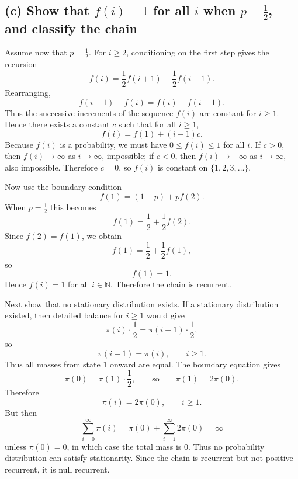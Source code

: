 \documentclass[11pt]{article}
\begin{document}
\subsection*{(c) Show that $f(i)=1$ for all $i$ when $p=\tfrac12$, and classify the chain}
Assume now that $p=\frac12$. For $i\ge2$, conditioning on the first step gives the recursion
\[
f(i)=\frac12 f(i+1)+\frac12 f(i-1).
\]
Rearranging,
\[
f(i+1)-f(i)=f(i)-f(i-1).
\]
Thus the successive increments of the sequence $f(i)$ are constant for $i\ge1$. Hence there exists a constant $c$ such that for all $i\ge1$,
\[
f(i)=f(1)+(i-1)c.
\]
Because $f(i)$ is a probability, we must have $0\le f(i)\le1$ for all $i$. If $c>0$, then $f(i)\to\infty$ as $i\to\infty$, impossible; if $c<0$, then $f(i)\to -\infty$ as $i\to\infty$, also impossible. Therefore $c=0$, so $f(i)$ is constant on $\{1,2,3,\dots\}$.

Now use the boundary condition
\[
f(1)=(1-p)+pf(2).
\]
When $p=\frac12$ this becomes
\[
f(1)=\frac12+\frac12 f(2).
\]
Since $f(2)=f(1)$, we obtain
\[
f(1)=\frac12+\frac12 f(1),
\]
so
\[
f(1)=1.
\]
Hence $f(i)=1$ for all $i\in\mathbb N$. Therefore the chain is recurrent.

Next show that no stationary distribution exists. If a stationary distribution existed, then detailed balance for $i\ge1$ would give
\[
\pi(i)\cdot\frac12=\pi(i+1)\cdot\frac12,
\]
so
\[
\pi(i+1)=\pi(i),\qquad i\ge1.
\]
Thus all masses from state $1$ onward are equal. The boundary equation gives
\[
\pi(0)=\pi(1)\cdot\frac12,
\qquad\text{so}\qquad
\pi(1)=2\pi(0).
\]
Therefore
\[
\pi(i)=2\pi(0),\qquad i\ge1.
\]
But then
\[
\sum_{i=0}^{\infty}\pi(i)=\pi(0)+\sum_{i=1}^{\infty}2\pi(0)=\infty
\]
unless $\pi(0)=0$, in which case the total mass is $0$. Thus no probability distribution can satisfy stationarity. Since the chain is recurrent but not positive recurrent, it is null recurrent.
\end{document}

